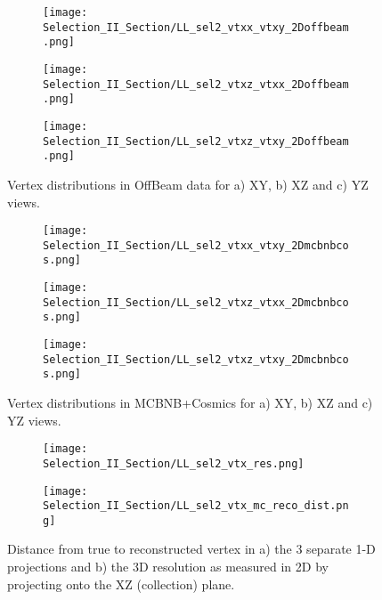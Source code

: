 \begin{figure}[t!]
\centering
  \begin{subfigure}[t]{0.26\textwidth}
    \centering
\texttt{[image: Selection\_II\_Section/LL\_sel2\_vtxx\_vtxy\_2Doffbeam.png]}
    \caption{ }
  \end{subfigure} 
  \hspace{10 mm}
  \begin{subfigure}[t]{0.26\textwidth}
    \centering
\texttt{[image: Selection\_II\_Section/LL\_sel2\_vtxz\_vtxx\_2Doffbeam.png]}
    \caption{ }
  \end{subfigure} 
  \hspace{10 mm}
  \begin{subfigure}[t]{0.26\textwidth}
    \centering
\texttt{[image: Selection\_II\_Section/LL\_sel2\_vtxz\_vtxy\_2Doffbeam.png]}
    \caption{ }
  \end{subfigure} 

\caption{ Vertex distributions in OffBeam data for a) XY, b) XZ and c) YZ views. }
\label{fig:ll_sel2_vertices_offbeam}
\end{figure}

\begin{figure}[h!]
\centering
  \begin{subfigure}[t]{0.26\textwidth}
    \centering
\texttt{[image: Selection\_II\_Section/LL\_sel2\_vtxx\_vtxy\_2Dmcbnbcos.png]}
    \caption{ }
  \end{subfigure} 
  \hspace{10 mm}
  \begin{subfigure}[t]{0.26\textwidth}
    \centering
\texttt{[image: Selection\_II\_Section/LL\_sel2\_vtxz\_vtxx\_2Dmcbnbcos.png]}
    \caption{ }
  \end{subfigure} 
  \hspace{10 mm}
  \begin{subfigure}[t]{0.26\textwidth}
    \centering
\texttt{[image: Selection\_II\_Section/LL\_sel2\_vtxz\_vtxy\_2Dmcbnbcos.png]}
    \caption{ }
  \end{subfigure} 
\caption{ Vertex distributions in MCBNB+Cosmics for a) XY, b) XZ and c) YZ views. }
\label{fig:ll_sel2_vertices_mc}
\end{figure}


\begin{figure}[t!]
\centering
 \begin{subfigure}[t]{0.35\textwidth}
    \centering
\texttt{[image: Selection\_II\_Section/LL\_sel2\_vtx\_res.png]}
    \caption{ }
  \end{subfigure} 
  \hspace{10 mm}
  \begin{subfigure}[t]{0.35\textwidth}
    \centering
\texttt{[image: Selection\_II\_Section/LL\_sel2\_vtx\_mc\_reco\_dist.png]}
    \caption{ }
  \end{subfigure} 

\caption{Distance from true to reconstructed vertex in a) the 3 separate 1-D projections and b) the 3D resolution as measured in 2D by projecting onto the XZ (collection) plane. }
\label{fig:physics_sel2_vtxres}
\end{figure}

